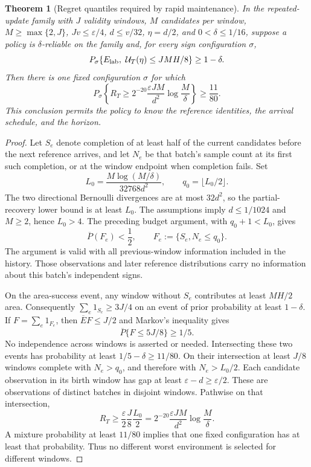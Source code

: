 \documentclass[11pt]{article}
\newtheorem{theorem}{Theorem}[section]
\theoremstyle{remark}
\begin{document}
\begin{theorem}[Regret quantiles required by rapid maintenance]
\label{thm:quantile_lower}
In the repeated-update family with $J$ validity windows, $M$ candidates per
window, $M\ge\max\{2,J\}$, $Jv\le\varepsilon/4$,
$d\le v/32$, $\eta=d/2$, and $0<\delta\le1/16$, suppose a policy is
$\delta$-reliable on the family and, for every sign configuration $\sigma$,
\[
 P_\sigma\{E_{\rm lab},\ \mathcal U_T(\eta)\le JMH/8\}\ge1-\delta.
\]
Then there is one fixed configuration $\sigma$ for which
\[
 P_\sigma\left\{R_T\ge
 2^{-20}\frac{\varepsilon JM}{d^2}\log\frac M\delta\right\}
 \ge\frac{11}{80}.
\]
This conclusion permits the policy to know the reference identities, the
arrival schedule, and the horizon.
\end{theorem}
\begin{proof}
Let $S_e$ denote completion of at least half of the current candidates before
the next reference arrives, and let $N_e$ be that batch's sample count at its
first such completion, or at the window endpoint when completion fails.
Set
\[
 L_0=\frac{M\log(M/\delta)}{32768d^2},\qquad
 q_0=\lfloor L_0/2\rfloor.
\]
The two directional Bernoulli divergences are at most $32d^2$, so the
partial-recovery lower bound is at least $L_0$. The assumptions imply
$d\le1/1024$ and $M\ge2$, hence $L_0>4$.
The preceding budget argument, with $q_0+1<L_0$, gives
\[
 \overline P(F_e)<\frac12,
 \qquad F_e:=\{S_e,N_e\le q_0\}.
\]
The argument is valid with all previous-window information included in the
history. Those observations and later reference distributions carry no
information about this batch's independent signs.

On the area-success event, any window without $S_e$ contributes at least
$MH/2$ area. Consequently $\sum_e1_{S_e}\ge3J/4$ on an event of prior
probability at least $1-\delta$. If $F=\sum_e1_{F_e}$, then
$\overline EF\le J/2$ and Markov's inequality gives
\[
 \overline P\{F\le5J/8\}\ge1/5.
\]
No independence across windows is asserted or needed. Intersecting these two
events has probability at least
$1/5-\delta\ge11/80$. On their intersection at least $J/8$ windows complete
with $N_e>q_0$, and therefore with $N_e>L_0/2$.
Each candidate observation in its birth window has gap at least
$\varepsilon-d\ge\varepsilon/2$. These are observations of distinct batches
in disjoint windows. Pathwise on that intersection,
\[
 R_T\ge\frac{\varepsilon}{2}\frac J8\frac{L_0}{2}
 =2^{-20}\frac{\varepsilon JM}{d^2}\log\frac M\delta.
\]
A mixture probability at least $11/80$ implies that one fixed configuration
has at least that probability. Thus no different worst environment is selected
for different windows.
\end{proof}
\end{document}

